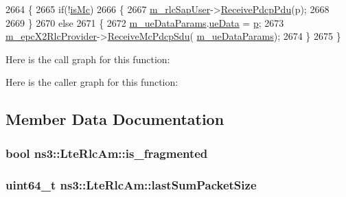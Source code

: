 \begin{DoxyCode}
2664 \{
2665   \textcolor{keywordflow}{if}(!\hyperlink{classns3_1_1LteRlc_a63b29f59aa944b3eaba8d8f156fba4c2}{isMc}) 
2666   \{
2667     \hyperlink{classns3_1_1LteRlc_a0156774a917567c2cee1f353d56dfffa}{m\_rlcSapUser}->\hyperlink{classns3_1_1LteRlcSapUser_aaadbd52044f4bf26453b6eb2e26df9c8}{ReceivePdcpPdu}(p);
2668 
2669   \}
2670   \textcolor{keywordflow}{else}
2671   \{
2672     \hyperlink{classns3_1_1LteRlc_a6f4d5d0a7f8d3dd3c35a5fc0598ea3b8}{m\_ueDataParams}.\hyperlink{structns3_1_1EpcX2Sap_1_1UeDataParams_aa194f663de494c1bf03bd42e51b81a8e}{ueData} = \hyperlink{lte__link__budget_8m_ac9de518908a968428863f829398a4e62}{p};
2673     \hyperlink{classns3_1_1LteRlc_aa997bbf2807b79443887abd57facd1c8}{m\_epcX2RlcProvider}->\hyperlink{classns3_1_1EpcX2RlcProvider_ae58a8184e3a1b3243f328b8d0efe3352}{ReceiveMcPdcpSdu}(
      \hyperlink{classns3_1_1LteRlc_a6f4d5d0a7f8d3dd3c35a5fc0598ea3b8}{m\_ueDataParams});
2674   \}
2675 \}
\end{DoxyCode}


Here is the call graph for this function\+:




Here is the caller graph for this function\+:




\subsection{Member Data Documentation}
\subsubsection[{\texorpdfstring{is\+\_\+fragmented}{is_fragmented}}]{\setlength{\rightskip}{0pt plus 5cm}bool ns3\+::\+Lte\+Rlc\+Am\+::is\+\_\+fragmented\hspace{0.3cm}{\ttfamily [private]}}\hypertarget{classns3_1_1LteRlcAm_ad61d1c9547fae2b5e50ace0e38c6bee4}{}\label{classns3_1_1LteRlcAm_ad61d1c9547fae2b5e50ace0e38c6bee4}
\subsubsection[{\texorpdfstring{last\+Sum\+Packet\+Size}{lastSumPacketSize}}]{\setlength{\rightskip}{0pt plus 5cm}uint64\+\_\+t ns3\+::\+Lte\+Rlc\+Am\+::last\+Sum\+Packet\+Size\hspace{0.3cm}{\ttfamily [private]}}\hypertarget{classns3_1_1LteRlcAm_a37135b151c291c00f8d0345f8f442561}{}\label{classns3_1_1LteRlcAm_a37135b151c291c00f8d0345f8f442561}
